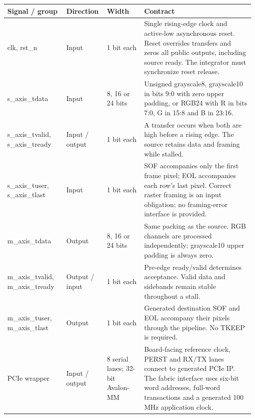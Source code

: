 \documentclass[11pt,a4paper]{article}
\begin{document}
{\small\renewcommand{\arraystretch}{1.18}\begin{longtable}{@{}L{0.21\textwidth}|L{0.12\textwidth}|L{0.12\textwidth}|L{0.45\textwidth}@{}}\toprule

\textbf{Signal /\allowbreak{} group} & \textbf{Direction} & \textbf{Width} & \textbf{Contract}\\\midrule\endhead

clk,\allowbreak{} rst\_\allowbreak{}n & Input & 1 bit each & Single rising-edge clock and active-low asynchronous reset. Reset overrides transfers and zeros all public outputs,\allowbreak{} including source ready. The integrator must synchronize reset release.\\[2pt]\hline

s\_\allowbreak{}axis\_\allowbreak{}tdata & Input & 8,\allowbreak{} 16 or 24 bits & Unsigned grayscal\allowbreak{}e8,\allowbreak{} grayscal\allowbreak{}e10 in bits 9:0 with zero upper padding,\allowbreak{} or RGB24 with R in bits 7:0,\allowbreak{} G in 15:8 and B in 23:16.\\[2pt]\hline

s\_\allowbreak{}axis\_\allowbreak{}tvalid,\allowbreak{} s\_\allowbreak{}axis\_\allowbreak{}tready & Input /\allowbreak{} output & 1 bit each & A transfer occurs when both are high before a rising edge. The source retains data and framing while stalled.\\[2pt]\hline

s\_\allowbreak{}axis\_\allowbreak{}tuser,\allowbreak{} s\_\allowbreak{}axis\_\allowbreak{}tlast & Input & 1 bit each & SOF accompanies only the first frame pixel; EOL accompanies each row's last pixel. Correct raster framing is an input obligation; no framing-error interface is provided.\\[2pt]\hline

m\_\allowbreak{}axis\_\allowbreak{}tdata & Output & 8,\allowbreak{} 16 or 24 bits & Same packing as the source. RGB channels are processed independently; grayscal\allowbreak{}e10 upper padding is always zero.\\[2pt]\hline

m\_\allowbreak{}axis\_\allowbreak{}tvalid,\allowbreak{} m\_\allowbreak{}axis\_\allowbreak{}tready & Output /\allowbreak{} input & 1 bit each & Pre-edge ready/\allowbreak{}valid determines acceptance. Valid data and sidebands remain stable throughout a stall.\\[2pt]\hline

m\_\allowbreak{}axis\_\allowbreak{}tuser,\allowbreak{} m\_\allowbreak{}axis\_\allowbreak{}tlast & Output & 1 bit each & Generated destination SOF and EOL accompany their pixels through the pipeline. No TKEEP is required.\\[2pt]\hline

PCIe wrapper & Input /\allowbreak{} output & 8 serial lanes; 32-bit Avalon-MM & Board-facing reference clock,\allowbreak{} PERST and RX/\allowbreak{}TX lanes connect to generated PCIe IP. The fabric interface uses six-bit word addresses,\allowbreak{} full-word transactions and a generated 100 MHz application clock.\\[2pt]\hline

\bottomrule\end{longtable}}
\end{document}

